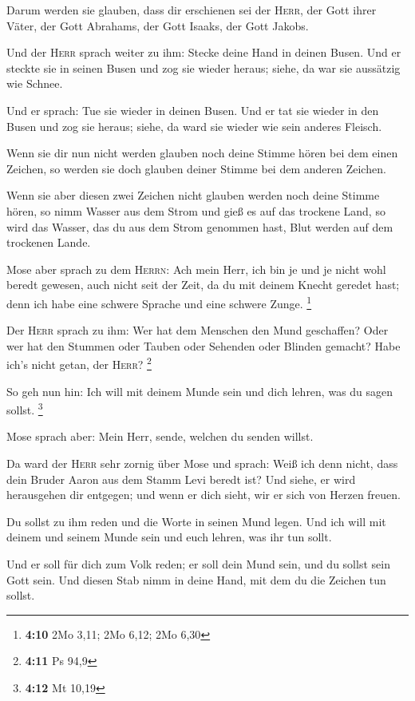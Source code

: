  Darum werden sie glauben, dass dir erschienen sei der
\textsc{Herr}, der Gott ihrer Väter, der Gott Abrahams, der Gott Isaaks,
der Gott Jakobs.

 Und der \textsc{Herr} sprach weiter zu ihm: Stecke deine
Hand in deinen Busen. Und er steckte sie in seinen Busen und zog sie
wieder heraus; siehe, da war sie aussätzig wie Schnee.

 Und er sprach: Tue sie wieder in deinen Busen. Und er tat
sie wieder in den Busen und zog sie heraus; siehe, da ward sie wieder
wie sein anderes Fleisch.

 Wenn sie dir nun nicht werden glauben noch deine Stimme
hören bei dem einen Zeichen, so werden sie doch glauben deiner Stimme
bei dem anderen Zeichen.

 Wenn sie aber diesen zwei Zeichen nicht glauben werden
noch deine Stimme hören, so nimm Wasser aus dem Strom und gieß es auf
das trockene Land, so wird das Wasser, das du aus dem Strom genommen
hast, Blut werden auf dem trockenen Lande.

 Mose aber sprach zu dem \textsc{Herrn}: Ach mein Herr,
ich bin je und je nicht wohl beredt gewesen, auch nicht seit der Zeit,
da du mit deinem Knecht geredet hast; denn ich habe eine schwere Sprache
und eine schwere Zunge. \footnote{\textbf{4:10} 2Mo 3,11; 2Mo 6,12; 2Mo
  6,30}

 Der \textsc{Herr} sprach zu ihm: Wer hat dem Menschen
den Mund geschaffen? Oder wer hat den Stummen oder Tauben oder Sehenden
oder Blinden gemacht? Habe ich's nicht getan, der \textsc{Herr}?
\footnote{\textbf{4:11} Ps 94,9}

 So geh nun hin: Ich will mit deinem Munde sein und dich
lehren, was du sagen sollst. \footnote{\textbf{4:12} Mt 10,19}

 Mose sprach aber: Mein Herr, sende, welchen du senden
willst.

 Da ward der \textsc{Herr} sehr zornig über Mose und
sprach: Weiß ich denn nicht, dass dein Bruder Aaron aus dem Stamm Levi
beredt ist? Und siehe, er wird herausgehen dir entgegen; und wenn er
dich sieht, wir er sich von Herzen freuen.

 Du sollst zu ihm reden und die Worte in seinen Mund
legen. Und ich will mit deinem und seinem Munde sein und euch lehren,
was ihr tun sollt.

 Und er soll für dich zum Volk reden; er soll dein Mund
sein, und du sollst sein Gott sein.  Und diesen Stab nimm
in deine Hand, mit dem du die Zeichen tun sollst.

